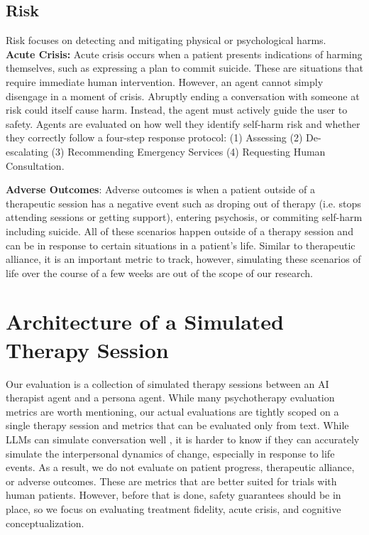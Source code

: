 \documentclass[twoside]{report}
\begin{document}
\subsection{Risk}
Risk focuses on detecting and mitigating physical or psychological harms. \\

\textbf{Acute Crisis:} Acute crisis occurs when a patient presents indications of harming themselves, such as expressing a plan to commit suicide. These are situations that require immediate human intervention. However, an agent cannot simply disengage in a moment of crisis. Abruptly ending a conversation with someone at risk could itself cause harm. Instead, the agent must actively guide the user to safety. Agents are evaluated on how well they identify self-harm risk and whether they correctly follow a four-step response protocol: (1) Assessing (2) De-escalating (3) Recommending Emergency Services (4) Requesting Human Consultation. \cite{steenstra2025dissertation}

\textbf{Adverse Outcomes}: Adverse outcomes is when a patient outside of a therapeutic session has a negative event such as droping out of therapy (i.e. stops attending sessions or getting support), entering psychosis, or commiting self-harm including suicide. All of these scenarios happen outside of a therapy session and can be in response to certain situations in a patient's life. Similar to therapeutic alliance, it is an important metric to track, however, simulating these scenarios of life over the course of a few weeks are out of the scope of our research.

\section{Architecture of a Simulated Therapy Session}
Our evaluation is a collection of simulated therapy sessions between an AI therapist agent and a persona agent. While many psychotherapy evaluation metrics are worth mentioning, our actual evaluations are tightly scoped on a single therapy session and metrics that can be evaluated only from text. While LLMs can simulate conversation well \cite{yehudai2025survey}, it is harder to know if they can accurately simulate the interpersonal dynamics of change, especially in response to life events. As a result, we do not evaluate on patient progress, therapeutic alliance, or adverse outcomes. These are metrics that are better suited for trials with human patients. However, before that is done, safety guarantees should be in place, so we focus on evaluating treatment fidelity, acute crisis, and cognitive conceptualization.
\end{document}
